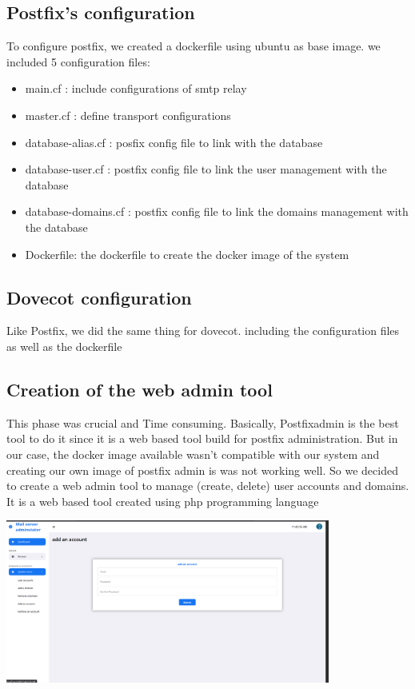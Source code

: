 \documentclass[12pt]{article}
\begin{document}
\subsection{Postfix's configuration}
To configure postfix, we created a dockerfile using ubuntu as base image. we included 5 configuration files: 
\begin{itemize}
    \item main.cf : include configurations of smtp relay
    \item master.cf : define transport configurations
    \item database-alias.cf : posfix config file to link with the database
    \item database-user.cf : postfix config file to link the user management with the database
    \item database-domains.cf : postfix config file to link the domains management with the database
    \item Dockerfile: the dockerfile to create the docker image of the system
\end{itemize}
\subsection{Dovecot configuration}
Like Postfix, we did the same thing for dovecot. including the configuration files as well as the dockerfile
\subsection{Creation of the web admin tool}
This phase was crucial and Time consuming. Basically, Postfixadmin is the best tool to do it since it is a web based tool build for postfix administration. But in our case, the docker image available wasn't compatible with our system and creating our own image of postfix admin is was not working well. So we decided to create a web admin tool to manage (create, delete) user accounts and domains.
It is a web based tool created using php programming language
\begin{center}
    \includegraphics[width=0.8\textwidth]{admin.png}
     \label{ansible.png}
\end{center}
\end{document}
